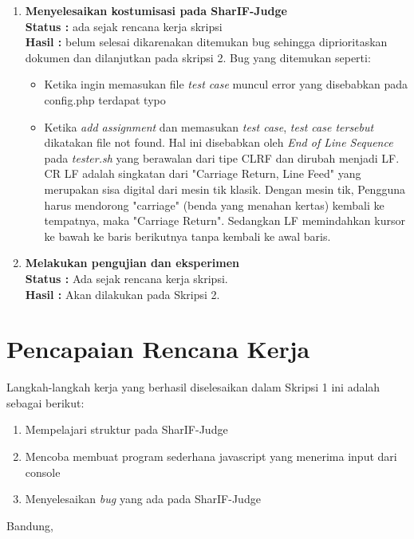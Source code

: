 \documentclass[a4paper,twoside]{article}
\begin{document}
\begin{enumerate}
		\item \textbf{Menyelesaikan kostumisasi pada SharIF-Judge}\\
		{\bf Status :} ada sejak rencana kerja skripsi \\
		{\bf Hasil :} belum selesai dikarenakan ditemukan bug  sehingga diprioritaskan dokumen dan dilanjutkan pada skripsi 2. Bug yang ditemukan seperti: 
		    \begin{itemize}
		        \item Ketika ingin memasukan file \textit{test case} muncul error yang disebabkan pada config.php terdapat typo
		        \item Ketika \textit{add assignment} dan memasukan \textit{test case}, \textit{test case tersebut} dikatakan file not found. Hal ini disebabkan oleh \textit{End of Line Sequence} pada \textit{tester.sh} yang berawalan dari tipe CLRF dan dirubah menjadi LF. CR LF adalah singkatan dari "Carriage Return, Line Feed" yang merupakan sisa digital dari mesin tik klasik. Dengan mesin tik, Pengguna harus mendorong "carriage" (benda yang menahan kertas) kembali ke tempatnya, maka "Carriage Return". Sedangkan LF memindahkan kursor ke bawah ke baris berikutnya tanpa kembali ke awal baris.
		    \end{itemize}
		   

		\item \textbf{Melakukan pengujian dan eksperimen} \\
		{\bf Status :} Ada sejak rencana kerja skripsi.\\
		{\bf Hasil :} Akan dilakukan pada Skripsi 2.

	\end{enumerate}

\section{Pencapaian Rencana Kerja}
Langkah-langkah kerja yang berhasil diselesaikan dalam Skripsi 1 ini adalah sebagai berikut:
\begin{enumerate}
\item Mempelajari struktur pada  SharIF-Judge
\item Mencoba membuat program sederhana javascript yang menerima input dari console
\item Menyelesaikan \textit{bug} yang ada pada SharIF-Judge 
\end{enumerate}


\vspace{1cm}
\centering Bandung, \tanggal\\
\vspace{2cm} \nama \\ 
\vspace{1cm}
\end{document}
